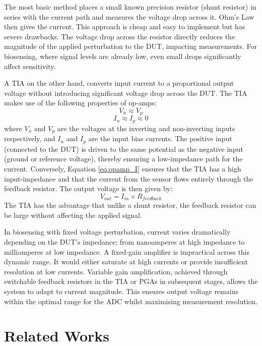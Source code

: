 The most basic method places a small known precision resistor (shunt resistor) in series with the current path and measures the voltage drop across it. Ohm's Law then gives the current. This approach is cheap and easy to implement but has severe drawbacks. The voltage drop across the resistor directly reduces the magnitude of the applied perturbation to the \ac{DUT}, impacting measurements. For biosensing, where signal levels are already low, even small drops significantly affect sensitivity.

A \ac{TIA} on the other hand, converts input current to a proportional output voltage without introducing significant voltage drop across the \ac{DUT}. The \ac{TIA} makes use of the following properties of op-amps:
\begin{equation}
    V_n \approx V_p
    \label{eq:opamp_V}
\end{equation}
\begin{equation}
    I_n \approx I_p \approx 0
    \label{eq:opamp_I}
\end{equation}
where $V_n$ and $V_p$ are the voltages at the inverting and non-inverting inputs respectively, and $I_n$ and $I_p$ are the input bias currents. The positive input (connected to the \ac{DUT}) is driven to the same potential as the negative input (ground or reference voltage), thereby ensuring a low-impedance path for the current. Conversely, Equation \ref{eq:opamp_I} ensures that the TIA has a high input-impedance and that the current from the sensor flows entirely through the feedback resistor. The output voltage is then given by:
\begin{equation}
    V_{out}=I_{in} \times R_{feedback}
    \label{eq:tia_gain}
\end{equation}
The \ac{TIA} has the advantage that unlike a shunt resistor, the feedback resistor can be large without affecting the applied signal.

In biosensing with fixed voltage perturbation, current varies dramatically depending on the \ac{DUT}'s impedance; from nanoamperes at high impedance to milliamperes at low impedance. A fixed-gain amplifier is impractical across this dynamic range. It would either saturate at high currents or provide insufficient resolution at low currents. Variable gain amplification, achieved through switchable feedback resistors in the \ac{TIA} or \acp{PGA} in subsequent stages, allows the system to adapt to current magnitude. This ensures output voltage remains within the optimal range for the \ac{ADC} whilst maximising measurement resolution.


\section{Related Works}

\label{chap:literature_review}